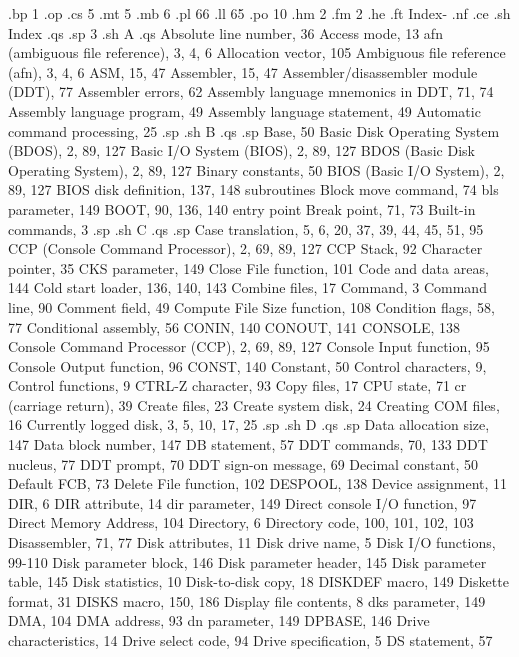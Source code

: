 .bp 1
.op
.cs 5
.mt 5
.mb 6
.pl 66
.ll 65
.po 10
.hm 2
.fm 2
.he
.ft                              Index-%
.nf
.ce
.sh
Index
.qs
.sp 3
.sh
A
.qs
Absolute line number, 36
Access mode, 13
afn (ambiguous file
    reference), 3, 4, 6
Allocation vector, 105
Ambiguous file reference
    (afn), 3, 4, 6
ASM, 15, 47
Assembler, 15, 47
Assembler/disassembler module
    (DDT), 77
Assembler errors, 62
Assembly language mnemonics
    in DDT, 71, 74
Assembly language program, 49
Assembly language statement, 49
Automatic command
    processing, 25
.sp
.sh
B
.qs
.sp
Base, 50
Basic Disk Operating System
    (BDOS), 2, 89, 127
Basic I/O System (BIOS),
    2, 89, 127
BDOS (Basic Disk Operating
    System), 2, 89, 127
Binary constants, 50
BIOS (Basic I/O System),
    2, 89, 127
BIOS disk definition, 137,  148
  subroutines
Block move command, 74
bls parameter, 149
BOOT, 90, 136, 140
  entry point
Break point, 71, 73
Built-in commands, 3
.sp
.sh
C
.qs
.sp
Case translation, 5, 6, 20,
    37, 39, 44, 45, 51, 95
CCP (Console Command
    Processor), 2, 69, 89, 127
CCP Stack, 92
Character pointer, 35
CKS parameter, 149
Close File function, 101
Code and data areas, 144
Cold start loader, 136,
    140, 143
Combine files, 17
Command, 3
Command line, 90
Comment field, 49
Compute File Size
    function, 108
Condition flags, 58, 77
Conditional assembly, 56
CONIN, 140
CONOUT, 141
CONSOLE, 138
Console Command Processor
    (CCP), 2, 69, 89, 127
Console Input function, 95
Console Output function, 96
CONST, 140
Constant, 50
Control characters, 9,
Control functions, 9
CTRL-Z character, 93
Copy files, 17
CPU state, 71
cr (carriage return), 39
Create files, 23
Create system disk, 24
Creating COM files, 16
Currently logged disk,
    3, 5, 10, 17, 25
.sp
.sh
D
.qs
.sp
Data allocation size, 147
Data block number, 147
DB statement, 57
DDT commands, 70, 133
DDT nucleus, 77
DDT prompt, 70
DDT sign-on message, 69
Decimal constant, 50
Default FCB, 73
Delete File function, 102
DESPOOL, 138
Device assignment, 11
DIR, 6
DIR attribute, 14
dir parameter, 149
Direct console I/O
    function, 97
Direct Memory Address, 104
Directory, 6
Directory code, 100, 101,
    102, 103
Disassembler, 71, 77
Disk attributes, 11
Disk drive name, 5
Disk I/O functions, 99-110
Disk parameter block, 146
Disk parameter header, 145
Disk parameter table, 145
Disk statistics, 10
Disk-to-disk copy, 18
DISKDEF macro, 149
Diskette format, 31
DISKS macro, 150, 186
Display file contents, 8
dks parameter, 149
DMA, 104
DMA address, 93
dn parameter, 149
DPBASE, 146
Drive characteristics, 14
Drive select code, 94
Drive specification, 5
DS statement, 57
